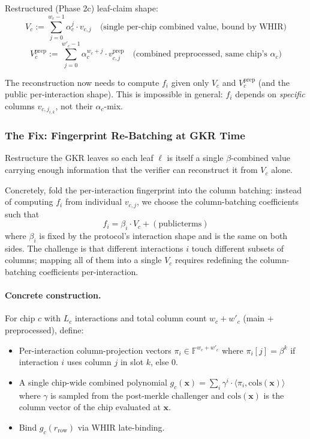 Restructured (Phase 2c) leaf-claim shape:
$$
V_c := \sum_{j=0}^{w_c-1} \alpha_c^j \cdot v_{c,j}
\quad\text{(single per-chip combined value, bound by WHIR)}
$$
$$
V_c^{\mathrm{prep}} := \sum_{j=0}^{w'_c-1} \alpha_c^{w_c+j} \cdot v_{c,j}^{\mathrm{prep}}
\quad\text{(combined preprocessed, same chip's $\alpha_c$)}
$$

The reconstruction now needs to compute $f_i$ given only $V_c$ and
$V_c^{\mathrm{prep}}$ (and the public per-interaction shape).  This
is impossible in general: $f_i$ depends on \emph{specific} columns
$v_{c,j_{i,k}}$, not their $\alpha_c$-mix.

\subsubsection{The Fix: Fingerprint Re-Batching at GKR Time}

Restructure the GKR leaves so each leaf $\ell$ is itself a single
$\beta$-combined value carrying enough information that the
verifier can reconstruct it from $V_c$ alone.

Concretely, fold the per-interaction fingerprint into the column
batching: instead of computing $f_i$ from individual $v_{c,j}$, we
choose the column-batching coefficients such that
$$
f_i = \beta_i \cdot V_c + \mathrm{(public terms)}
$$
where $\beta_i$ is fixed by the protocol's interaction shape and is
the same on both sides.  The challenge is that different interactions
$i$ touch different subsets of columns; mapping all of them into a
single $V_c$ requires redefining the column-batching coefficients
per-interaction.

\paragraph{Concrete construction.}
For chip $c$ with $L_c$ interactions and total column count
$w_c + w'_c$ (main + preprocessed), define:
\begin{itemize}
  \item Per-interaction column-projection vectors
        $\pi_i \in \mathbb{F}^{w_c + w'_c}$ where $\pi_i[j] = \beta^k$
        if interaction $i$ uses column $j$ in slot $k$, else $0$.
  \item A single chip-wide combined polynomial
        $g_c(\mathbf{x}) = \sum_i \gamma^i \cdot \langle \pi_i,
        \mathrm{cols}(\mathbf{x}) \rangle$
        where $\gamma$ is sampled from the post-merkle challenger and
        $\mathrm{cols}(\mathbf{x})$ is the column vector of the chip
        evaluated at $\mathbf{x}$.
  \item Bind $g_c(r_{\mathrm{row}})$ via WHIR late-binding.
\end{itemize}

